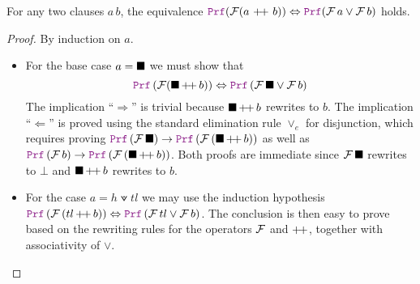 \begin{lemma}\label{lemma:clause-equiv-disj}
For any two clauses $a\,b$, the equivalence $\prf (\cal{F}(a~\pp~b)) \Leftrightarrow \prf (\cal{F}\,a \lor \cal{F}\,b)$ holds.
\end{lemma}
\begin{proof} By induction on $a$.
  \begin{itemize}
    \item For the base case $a = \nil$ we must show that
    \[
        \prf\, (\cal{F} (\nil\, \pp \, b)) \Leftrightarrow \prf\, (\cal{F}\,\nil \lor \cal{F}\,b)
    \]
    The implication ``$\Rightarrow$'' is trivial because $\nil\,\pp\,b$ rewrites to $b$. The implication ``$\Leftarrow$'' is proved using the standard elimination rule $\lor_e$ for disjunction, which requires proving $\prf\,(\cal{F}\,\nil) \ra \prf\,(\cal{F}\,(\nil\,\pp\,b))$ as well as $\prf\,(\cal{F}\,b) \ra \prf\,(\cal{F}\,(\nil\,\pp\,b))$. Both proofs are immediate since $\cal{F}\,\nil$ rewrites to $\bot$ and $\nil\,\pp\,b$ rewrites to $b$.
    \item For the case $a = h \veedot tl$ we may use the induction hypothesis $\prf\,(\cal{F}\, (tl\, \pp\, b)) \Leftrightarrow \prf\,(\cal{F}\,tl \lor \cal{F}\, b)$. The conclusion is then easy to prove based on the rewriting rules for the operators $\cal{F}$ and $\pp$, together with associativity of $\lor$.
    \end{itemize}
\end{proof}
